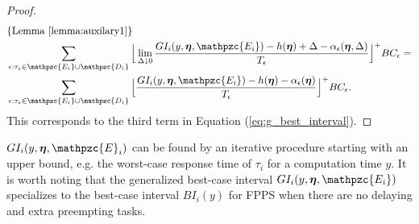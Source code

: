 \begin{proof}
\begin{align*}
	& \{ \text{Lemma \ref{lemma:auxilary1}} \} \\ 
	& \sum\limits_{\epsilon:\tau_{\epsilon} \in \mathpzc{E_i} \cup \mathpzc{D_i}} \Big\lfloor \lim \limits_{\Delta \downarrow 0}  \dfrac{GI_i(y, \vec{\eta},  \mathpzc{E_i})-h(\vec{\eta})+\Delta-\alpha_\epsilon(\vec{\eta},\Delta)}{T_\epsilon}\Big\rfloor^+  BC_\epsilon
	= \\
	& \sum\limits_{\epsilon:\tau_{\epsilon} \in \mathpzc{E_i} \cup \mathpzc{D_i}} \Big\lfloor  \dfrac{GI_i(y, \vec{\eta},  \mathpzc{E_i})-h(\vec{\eta})-\alpha_\epsilon(\vec{\eta})}{T_\epsilon}\Big\rfloor^+  BC_\epsilon.
	\end{align*}
	This corresponds to the third term in Equation (\ref{eq:g_best_interval}).
\end{proof}


$GI_i(y,\vec{\eta},\mathpzc{E}_i)$ can be found by an iterative procedure starting with an upper bound, e.g. the worst-case response time of $\tau_i$ for a computation time $y$. It is worth noting that the generalized best-case interval $GI_i(y, \vec{\eta},\mathpzc{E_i})$ specializes to the best-case interval $BI_i(y)$ for FPPS when there are no delaying and extra preempting tasks. 
\fi

